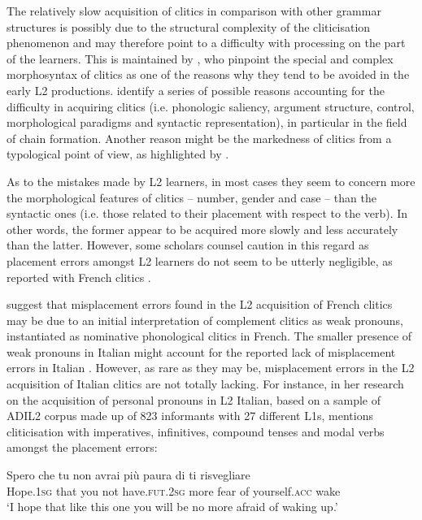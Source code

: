 \documentclass[output=paper,modfonts,nonflat,newtxmath]{langsci/langscibook}
\begin{document}
The relatively slow acquisition of clitics in comparison with other grammar structures is possibly due to the structural complexity of the cliticisation phenomenon and may therefore point to a difficulty with processing on the part of the learners. This is maintained by \citet{BellettiGuasti2015}, who pinpoint the special and complex morphosyntax of clitics as one of the reasons why they tend to be avoided in the early L2 productions. \citet{BottariEtAl2000} identify a series of possible reasons accounting for the difficulty in acquiring clitics (i.e. phonologic saliency, argument structure, control, morphological paradigms and syntactic representation), in particular in the field of chain formation. Another reason might be the markedness of clitics from a typological point of view, as highlighted by \citet[329]{Berretta1986}.

As to the mistakes made by L2 learners, in most cases they seem to concern more the morphological features of clitics – number, gender and case – than the syntactic ones (i.e. those related to their placement with respect to the verb). In other words, the former appear to be acquired more slowly and less accurately than the latter. However, some scholars counsel caution in this regard as placement errors amongst L2 learners do not seem to be utterly negligible, as reported with French clitics \citep{White1996, HulkMuller2000, BellettiHamann2004, GranfeldtSchlyter2004, HamannBelletti2006}.

\citet{HamannBelletti2006} suggest that misplacement errors found in the L2 acquisition of French clitics may be due to an initial interpretation of complement clitics as weak pronouns, instantiated as nominative phonological clitics in French. The smaller presence of weak pronouns in Italian might account for the reported lack of misplacement errors in Italian \citep{BellettiGuasti2015}. However, as rare as they may be, misplacement errors in the L2 acquisition of Italian clitics are not totally lacking. For instance, in her research on the acquisition of personal pronouns in L2 Italian, based on a sample of ADIL2 corpus made up of 823 informants with 27 different L1s, \citet[116]{Maffei2009} mentions cliticisation with imperatives, infinitives, compound tenses and modal verbs amongst the placement errors:

\ea  \label{ex:sciutti:28}
    \gll Spero che tu non avrai più paura di ti risvegliare\\
         Hope.\textsc{1sg} that you not have.\textsc{fut.2sg} more fear of yourself.\textsc{acc} wake\\
    \glt  ‘I hope that like this one you will be no more afraid of waking up.’
\z
\end{document}
